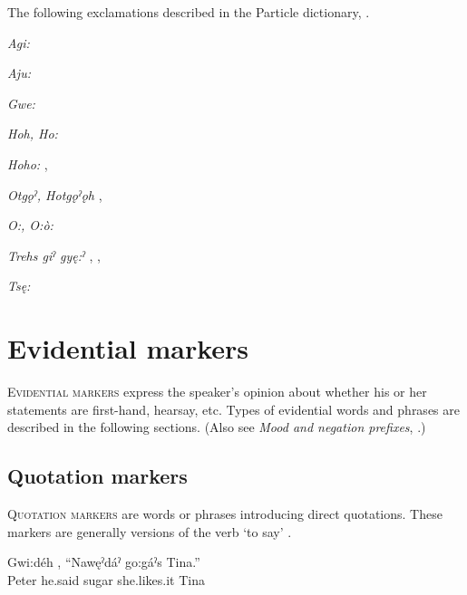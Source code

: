 The following exclamations described in the Particle dictionary, .

\begin{CayugaRelated}
\item{} \textit{Agi:} \\
\item{}\textit{Aju:} \\
\item{}\textit{Gwe:} \\
\item{}\textit{Hoh, Ho:} \\
\item{}\textit{Hoho:} , \\
\item{}\textit{Otgǫˀ, Hotgǫˀǫh} , \\
\item{}\textit{O:, O:ò:} \\
\item{}\textit{Trehs giˀ gyę:ˀ} , , \\
\item{}\textit{Tsę:} 
\end{CayugaRelated}

\section{Evidential markers} \label{ch:Evidential markers}
\textsc{Evidential markers} express the speaker’s opinion about whether his or her statements are first-hand, hearsay, etc. Types of evidential words and phrases are described in the following sections. (Also see \textit{Mood and negation prefixes}, .) 


\subsection{Quotation markers} \label{ch:Quotation markers}
\textsc{Quotation markers} are words or phrases introducing direct quotations. These markers are generally versions of the verb ‘to say’ .

\ea\label{ex:quotex}
 \gll Gwi:déh , “Nawęˀdáˀ go:gáˀs Tina.”\\
Peter he.said sugar she.likes.it Tina\\
\glt {}
\z

